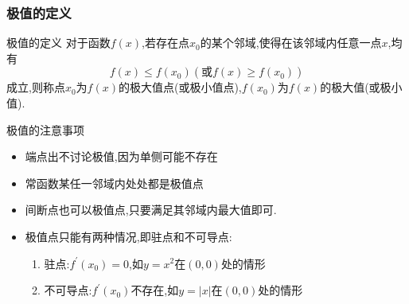 \documentclass[8pt a4paper, oneside, UTF8]{ctexbook}  %
\begin{document}
\begin{sloppypar}
    \subsubsection{极值的定义}
    \begin{defn}{极值的定义}{}
        对于函数$f(x)$,若存在点$x_0$的某个邻域,使得在该邻域内任意一点$x$,均有
        $$
            f(x)\leqslant f(x_0)(\text{或}f(x)\geqslant f(x_0))
        $$
        成立,则称点$x_0$为$f(x)$的极大值点(或极小值点),$f(x_0)$为$f(x)$的极大值(或极小值).
    \end{defn}
    \begin{criterion}{极值的注意事项}{}
        \begin{itemize}
            \item 端点出不讨论极值,因为单侧可能不存在
            \item 常函数某任一邻域内处处都是极值点
            \item 间断点也可以极值点,只要满足其邻域内最大值即可.
            \item 极值点只能有两种情况,即驻点和不可导点:
            \begin{enumerate}
                \item 驻点:$f^{\prime}(x_{0})=0$,如$y=x^{2}$在$(0,0)$处的情形
                \item 不可导点:$f^{\prime}(x_{0})$不存在,如$y=\left|x\right|$在$(0,0)$处的情形
            \end{enumerate}
        \end{itemize}
    \end{criterion}

\end{sloppypar}
\end{document}
